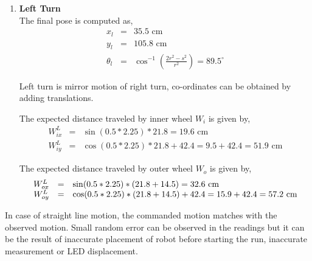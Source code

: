 \begin{enumerate}
	\item \textbf{Left Turn} \\
	The final pose is computed as,
	\begin{equation}
	\begin{array}{rcl}
	x_l &=& 35.5 \text{ cm} \\
	y_l &=& 105.8 \text{ cm} \\
	\theta_l &=& \cos^{-1}\left(\frac{2r^2 - s^2}{r^2}\right) = 89.5^{\circ}
	\end{array}
	\end{equation}
		
	Left turn is mirror motion of right turn, co-ordinates can be obtained by adding translations. 
	
	The expected distance traveled by inner wheel $W_i$ is given by,
	\begin{equation}
	\begin{array}{rcl}
	W^L_{ix} &=& \sin(0.5 * 2.25) * 21.8 = 19.6 \text{ cm} \\
	W^L_{iy} &=& \cos(0.5 * 2.25) * 21.8 + 42.4 = 9.5 + 42.4 = 51.9 \text{ cm}
	\end{array}
	\end{equation}
	
	The expected distance traveled by outer wheel $W_o$ is given by,
	\begin{equation}
	\begin{array}{rcl}
	W^L_{ox} &=& \sin(0.5 * 2.25) * (21.8 + 14.5) = 32.6 \text{ cm}\\
	W^L_{oy} &=& \cos(0.5 * 2.25) * (21.8 + 14.5) + 42.4 = 15.9 + 42.4 = 57.2 \text{ cm}$$
	\end{array}
	\end{equation}
	
\end{enumerate}

In case of straight line motion, the commanded motion matches with the observed motion. Small random error can be observed in the readings but it can be the result of inaccurate placement of robot before starting the run, inaccurate measurement or LED displacement. 


